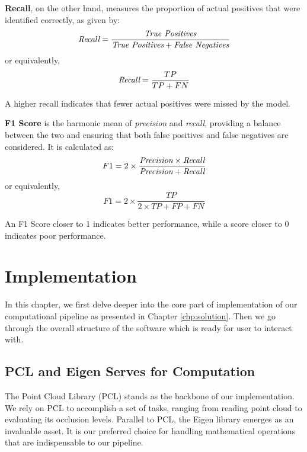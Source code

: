 \documentclass[11pt, a4paper,oneside,chapterprefix=false]{scrbook}
\begin{document}
\vspace{10pt}

\textbf{Recall}, on the other hand, measures the proportion of actual positives that were identified correctly, as given by:
\[
    \emph{Recall} = \frac{\emph{True Positives}}{\emph{True Positives} + \emph{False Negatives}}
\]
or equivalently,
\[
    \emph{Recall} = \frac{TP}{TP + FN}
\]

A higher recall indicates that fewer actual positives were missed by the model.

\vspace{10pt}

\textbf{F1 Score} is the harmonic mean of \emph{precision} and \emph{recall}, providing a balance between the two and ensuring that both false positives and false negatives are considered. It is calculated as:
\[
    F1 = 2 \times \frac{\emph{Precision} \times \emph{Recall}}{\emph{Precision} + \emph{Recall}}
\]
or equivalently,
\[
    F1 = 2 \times \frac{TP}{2 \times TP + FP + FN}
\]

An F1 Score closer to 1 indicates better performance, while a score closer to 0 indicates poor performance.

\chapter{Implementation}\label{chp:implementation}

In this chapter, we first delve deeper into the core part of implementation of our computational pipeline as presented in Chapter \ref{chp:solution}. Then we go through the overall structure of the software which is ready for user to interact with.

\section{PCL and Eigen Serves for Computation}\label{sec:pcl and eigen}

The Point Cloud Library (PCL) \cite{Rusu_ICRA2011_PCL} stands as the backbone of our implementation. We rely on PCL to accomplish a set of tasks, ranging from reading point cloud to evaluating its occlusion levels. Parallel to PCL, the Eigen library \cite{eigenweb} emerges as an invaluable asset. It is our preferred choice for handling mathematical operations that are indispensable to our pipeline.
\end{document}
